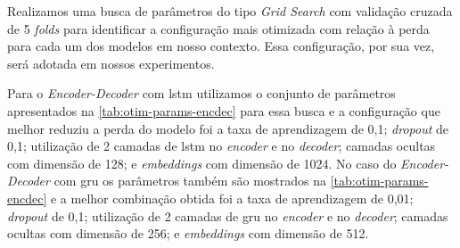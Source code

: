 

Realizamos uma busca de parâmetros do tipo \textit{Grid Search} com validação cruzada de 5 \textit{folds} para identificar a configuração mais otimizada com relação à perda para cada um dos modelos em nosso contexto. Essa configuração, por sua vez, será adotada em nossos experimentos.



Para o \textit{Encoder-Decoder} com \acrshort{lstm} utilizamos o conjunto de parâmetros apresentados na \autoref{tab:otim-params-encdec} para essa busca e a configuração que melhor reduziu a perda do modelo foi a taxa de aprendizagem de 0,1; \textit{dropout} de 0,1; utilização de 2 camadas de \acrshort{lstm} no \textit{encoder} e no \textit{decoder}; camadas ocultas com dimensão de 128; e \textit{embeddings} com dimensão de 1024.
No caso do \textit{Encoder-Decoder} com \acrshort{gru} os parâmetros também são mostrados na \autoref{tab:otim-params-encdec} e a melhor combinação obtida foi a taxa de aprendizagem de 0,01; \textit{dropout} de 0,1; utilização de 2 camadas de \acrshort{gru} no \textit{encoder} e no \textit{decoder}; camadas ocultas com dimensão de 256; e \textit{embeddings} com dimensão de 512.

